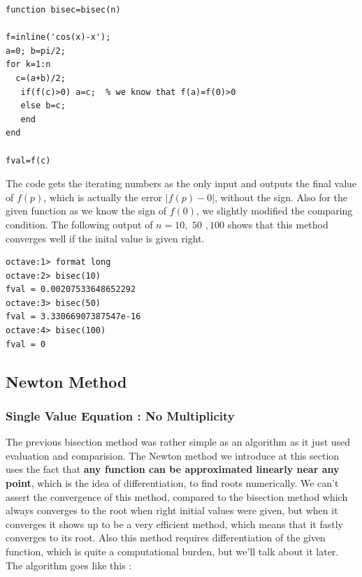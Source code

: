 \documentclass[paper=a4, fontsize=11pt]{scrartcl}
\begin{document}
\begin{lstlisting}[label=test.m,caption=bisec.m]
function bisec=bisec(n)

f=inline('cos(x)-x');
a=0; b=pi/2;
for k=1:n
  c=(a+b)/2;
   if(f(c)>0) a=c;  % we know that f(a)=f(0)>0 
   else b=c;
   end
end

fval=f(c)
\end{lstlisting}
\vspace{0.15in}

The code gets the iterating numbers as the only input and outputs the final value of $f(p)$, which is actually the error $|f(p)-0|$, without the sign. Also for the given function as we know the sign of $f(0)$, we slightly modified the comparing condition. The following output of $n=10,$ $50$ $,100$ shows that this method converges well if the inital value is given right.

\begin{verbatim}
octave:1> format long
octave:2> bisec(10)
fval = 0.00207533648652292
octave:3> bisec(50)
fval = 3.33066907387547e-16
octave:4> bisec(100)
fval = 0
\end{verbatim}

\vspace{0.15in}
\subsection{Newton Method}
\vspace{0.15in}
\subsubsection{Single Value Equation : No Multiplicity}
\vspace{0.15in}
The previous bisection method was rather simple as an algorithm as it just used evaluation and comparision. The Newton method we introduce at this section uses the fact that \textbf{any function can be approximated linearly near any point}, which is the idea of differentiation, to find roots numerically. We can't assert the convergence of this method, compared to the bisection method which always converges to the root when right initial values were given, but when it converges it shows up to be a very efficient method, which means that it fastly converges to its root. Also this method requires differentiation of the given function, which is quite a computational burden, but we'll talk about it later. The algorithm goes like this :
\vspace{0.15in}
\end{document}
